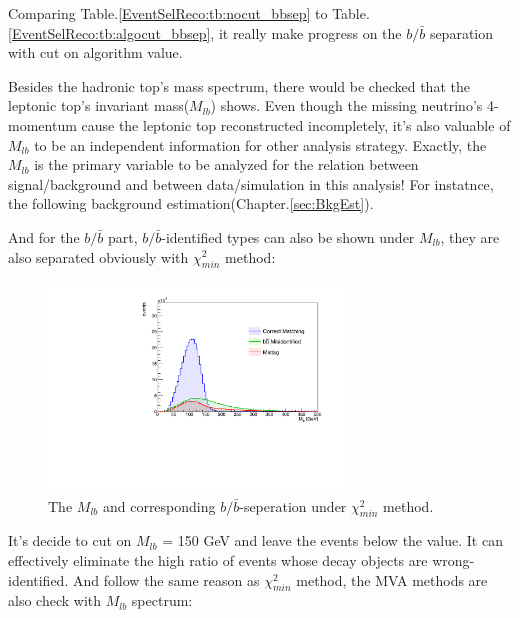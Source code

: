 		Comparing Table.\ref{EventSelReco:tb:nocut_bbsep} to Table.\ref{EventSelReco:tb:algocut_bbsep}, it really make progress on the $b/\bar{b}$ separation with cut on algorithm value. 

		Besides the hadronic top's mass spectrum, there would be checked that the leptonic top's invariant mass($M_{lb}$) shows. Even though the missing neutrino's 4-momentum cause the leptonic top reconstructed incompletely, it's also valuable of $M_{lb}$ to be an independent information for other analysis strategy. Exactly, the $M_{lb}$ is the primary variable to be analyzed for the relation between signal/background and between data/simulation in this analysis! For instatnce, the following background estimation(Chapter.\ref{sec:BkgEst}).

		And for the $b/\bar{b}$ part, $b/\bar{b}$-identified types can also be shown under $M_{lb}$, they are also separated obviously with $\chi^2_{min}$ method:

		\begin{figure}[H]
		\centering
			\includegraphics[width=0.7\textwidth]{Figures/EventSelReco/bbsep/chi2_bbsep_leptop_t.pdf}
		\caption{The $M_{lb}$ and corresponding $b/\bar{b}$-seperation under $\chi^2_{min}$ method.}
		\label{EventSelReco:fig:chi2_bbsep_leptop}
		\end{figure}
		\FloatBarrier

		It's decide to cut on $M_{lb}$ = 150 GeV and leave the events below the value. It can effectively eliminate the high ratio of events whose decay objects are wrong-identified. And follow the same reason as $\chi^2_{min}$ method, the MVA methods are also check with $M_{lb}$ spectrum:


